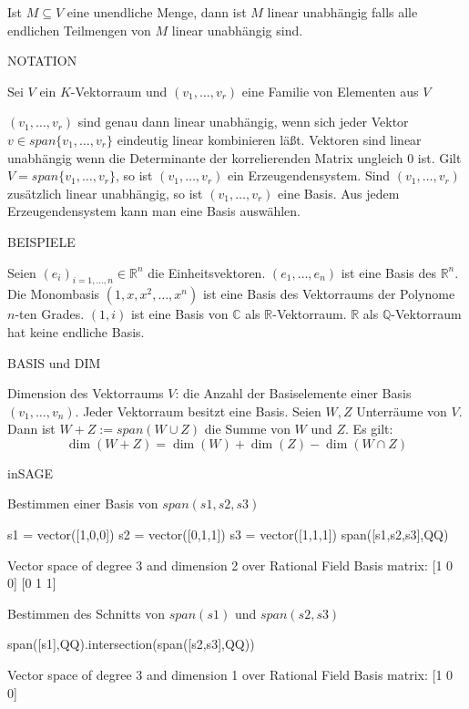 \documentclass[fontsize=12pt,paper=a4,twoside,bibtotoc,idxtotoc,
liststotoc,pagesize,BCOR1.2cm,DIV15,chapterprefix,pagesize=pdftex]{scrbook}
\theoremstyle{plain}
\theoremstyle{definition}
\theoremstyle{remark}
\begin{document}
 Ist $M \subseteq V$ eine unendliche Menge, dann ist $M$ linear unabhängig falls alle endlichen Teilmengen von $M$ linear unabhängig sind.



NOTATION

Sei $V$ ein $K$-Vektorraum und $(v_1,\dots ,v_r)$ eine Familie von
Elementen aus $V$

 $(v_1,\dots ,v_r)$ sind genau dann linear unabhängig, wenn sich
jeder Vektor $v \in span\{v_1, \dots ,v_r\}$ eindeutig linear kombinieren
läßt. 
 Vektoren sind linear unabhängig wenn die Determinante der korrelierenden Matrix ungleich 0 ist.
 Gilt $V=span\{v_1,\dots ,v_r \}$, so ist $(v_1, \dots ,v_r)$ ein
{\color{red} Erzeugendensystem}. Sind $(v_1, \dots ,v_r)$ zusätzlich linear
unabhängig, so ist $(v_1, \dots ,v_r)$ eine {\color{red} Basis}.
 Aus jedem Erzeugendensystem kann man eine Basis auswählen. 


BEISPIELE


 Seien $(e_i)_{i=1,\ldots,n} \in \mathbb{R}^n$ die Einheitsvektoren. $(e_1, \dots
,e_n)$ ist eine Basis des $\mathbb{R}^n$.
 Die Monombasis $(1,x,x^2,\dots, x^n)$ ist eine Basis des
Vektorraums der Polynome $n$-ten Grades.
 $(1,i)$ ist eine Basis von $\mathbb{C}$ als
$\mathbb{R}$-Vektorraum. 
 $\mathbb{R}$ als $\mathbb{Q}$-Vektorraum hat keine endliche
Basis. 


BASIS und DIM


 {\color{red} Dimension} des Vektorraums $V$: die  Anzahl der Basiselemente einer Basis $(v_1,\dots, v_n)$.
 Jeder Vektorraum besitzt eine Basis.
 Seien $W,Z$ Unterräume von $V$. Dann ist {\color{red} $W+Z:=span(W \cup Z)$}
die {\color{red} Summe} von $W$ und $Z$. Es gilt:
\[ \dim(W+Z)=\dim(W) + \dim (Z) - \dim( W \cap Z) \]


inSAGE


 Bestimmen einer Basis von $span(s1,s2,s3)$
\begin{sagein}
s1 = vector([1,0,0])
s2 = vector([0,1,1])
s3 = vector([1,1,1])
span([s1,s2,s3],QQ)
\end{sagein}
\begin{sage}
Vector space of degree 3 and dimension 2 over Rational Field
Basis matrix:
[1 0 0]
[0 1 1]
\end{sage}
 Bestimmen des Schnitts von $span(s1)$ und $span(s2,s3)$
\begin{sagein}
span([s1],QQ).intersection(span([s2,s3],QQ))
\end{sagein}
\begin{sage}
Vector space of degree 3 and dimension 1 over Rational Field
Basis matrix:
[1 0 0]
\end{sage}
\end{document}
